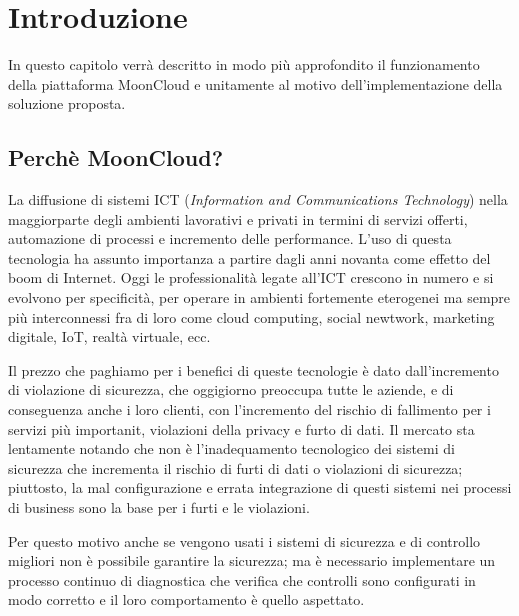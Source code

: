 \chapter{Introduzione}
In questo capitolo verrà descritto in modo più approfondito 
il funzionamento della piattaforma MoonCloud e unitamente al 
motivo dell'implementazione della soluzione proposta.

\section{Perchè MoonCloud?}
La diffusione di sistemi ICT (\textit{Information and Communications Technology})
nella maggiorparte degli ambienti lavorativi e privati in termini di servizi offerti,
automazione di processi e incremento delle performance. L'uso di questa tecnologia 
ha assunto importanza a partire dagli anni novanta come effetto del boom di Internet.
Oggi le professionalità legate all'ICT crescono in numero e si evolvono per 
specificità, per operare in ambienti fortemente eterogenei ma sempre più interconnessi 
fra di loro come cloud computing, social newtwork, marketing digitale, IoT, realtà virtuale,
ecc.

Il prezzo che paghiamo per i benefici di queste tecnologie è dato dall'incremento di 
violazione di sicurezza, che oggigiorno preoccupa tutte le aziende, e di conseguenza anche i 
loro clienti, con l'incremento del rischio di fallimento per i servizi più importanit, 
violazioni della privacy e furto di dati.
\newline
Il mercato sta lentamente notando che non è l'inadequamento tecnologico dei sistemi di sicurezza
che incrementa il rischio di furti di dati o violazioni di sicurezza; piuttosto, la mal configurazione
e errata integrazione di questi sistemi nei processi di business sono la base per 
i furti e le violazioni. \cite{cloud-Platform-for-ICT-Security-Governance}

Per questo motivo anche se vengono usati i sistemi di sicurezza e di controllo migliori non è possibile 
garantire la sicurezza; ma è necessario implementare un processo continuo di diagnostica che verifica che 
controlli sono configurati in modo corretto e il loro comportamento è quello aspettato.

